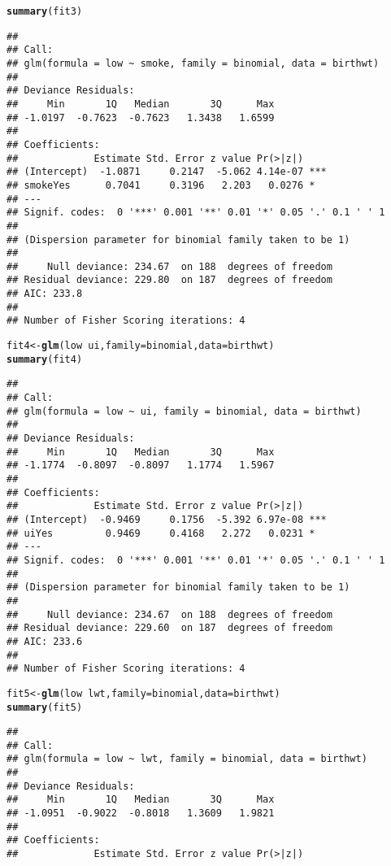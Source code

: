 \documentclass{article}\usepackage[]{graphicx}\usepackage[]{color}
\makeatletter
\newcommand{\hlopt}[1]{\textcolor[rgb]{0,0,0}{#1}}%
\newcommand{\hlstd}[1]{\textcolor[rgb]{0.345,0.345,0.345}{#1}}%
\newcommand{\hlkwb}[1]{\textcolor[rgb]{0.69,0.353,0.396}{#1}}%
\newcommand{\hlkwc}[1]{\textcolor[rgb]{0.333,0.667,0.333}{#1}}%
\newcommand{\hlkwd}[1]{\textcolor[rgb]{0.737,0.353,0.396}{\textbf{#1}}}%
\newenvironment{kframe}{%
 \def\at@end@of@kframe{}%
 \ifinner\ifhmode%
  \def\at@end@of@kframe{\end{minipage}}%
  \begin{minipage}{\columnwidth}%
 \fi\fi%
 \def\FrameCommand##1{\hskip\@totalleftmargin \hskip-\fboxsep
 \colorbox{shadecolor}{##1}\hskip-\fboxsep
     \hskip-\linewidth \hskip-\@totalleftmargin \hskip\columnwidth}%
 \MakeFramed {\advance\hsize-\width
   \@totalleftmargin\z@ \linewidth\hsize
   \@setminipage}}%
 {\par\unskip\endMakeFramed%
 \at@end@of@kframe}
\newenvironment{knitrout}{}{} %
\makeatother
\begin{document}
\begin{knitrout}
\begin{kframe}
\begin{alltt}
\hlkwd{summary}\hlstd{(fit3)}
\end{alltt}
\begin{verbatim}
## 
## Call:
## glm(formula = low ~ smoke, family = binomial, data = birthwt)
## 
## Deviance Residuals: 
##     Min       1Q   Median       3Q      Max  
## -1.0197  -0.7623  -0.7623   1.3438   1.6599  
## 
## Coefficients:
##             Estimate Std. Error z value Pr(>|z|)    
## (Intercept)  -1.0871     0.2147  -5.062 4.14e-07 ***
## smokeYes      0.7041     0.3196   2.203   0.0276 *  
## ---
## Signif. codes:  0 '***' 0.001 '**' 0.01 '*' 0.05 '.' 0.1 ' ' 1
## 
## (Dispersion parameter for binomial family taken to be 1)
## 
##     Null deviance: 234.67  on 188  degrees of freedom
## Residual deviance: 229.80  on 187  degrees of freedom
## AIC: 233.8
## 
## Number of Fisher Scoring iterations: 4
\end{verbatim}
\begin{alltt}
\hlstd{fit4} \hlkwb{<-} \hlkwd{glm}\hlstd{(low} \hlopt{~} \hlstd{ui,} \hlkwc{family} \hlstd{= binomial,} \hlkwc{data} \hlstd{= birthwt)}
\hlkwd{summary}\hlstd{(fit4)}
\end{alltt}
\begin{verbatim}
## 
## Call:
## glm(formula = low ~ ui, family = binomial, data = birthwt)
## 
## Deviance Residuals: 
##     Min       1Q   Median       3Q      Max  
## -1.1774  -0.8097  -0.8097   1.1774   1.5967  
## 
## Coefficients:
##             Estimate Std. Error z value Pr(>|z|)    
## (Intercept)  -0.9469     0.1756  -5.392 6.97e-08 ***
## uiYes         0.9469     0.4168   2.272   0.0231 *  
## ---
## Signif. codes:  0 '***' 0.001 '**' 0.01 '*' 0.05 '.' 0.1 ' ' 1
## 
## (Dispersion parameter for binomial family taken to be 1)
## 
##     Null deviance: 234.67  on 188  degrees of freedom
## Residual deviance: 229.60  on 187  degrees of freedom
## AIC: 233.6
## 
## Number of Fisher Scoring iterations: 4
\end{verbatim}
\begin{alltt}
\hlstd{fit5} \hlkwb{<-} \hlkwd{glm}\hlstd{(low} \hlopt{~} \hlstd{lwt,} \hlkwc{family} \hlstd{= binomial,} \hlkwc{data} \hlstd{= birthwt)}
\hlkwd{summary}\hlstd{(fit5)}
\end{alltt}
\begin{verbatim}
## 
## Call:
## glm(formula = low ~ lwt, family = binomial, data = birthwt)
## 
## Deviance Residuals: 
##     Min       1Q   Median       3Q      Max  
## -1.0951  -0.9022  -0.8018   1.3609   1.9821  
## 
## Coefficients:
##             Estimate Std. Error z value Pr(>|z|)  

\end{verbatim}
\end{kframe}
\end{knitrout}
\end{document}
